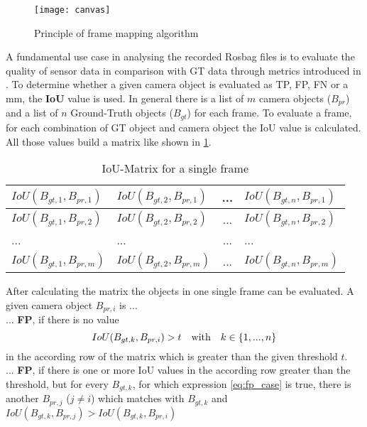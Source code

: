 \begin{figure}[thpb]
	\centering
	\texttt{[image: canvas]}
	\caption{Principle of frame mapping algorithm}
	\label{fig:frame_mapping}
\end{figure}

A fundamental use case in analysing the recorded Rosbag files is to evaluate the quality of sensor data in comparison with GT data through metrics introduced in \cite{Reway}. 
To determine whether a given camera object is evaluated as \ac{TP}, \ac{FP}, \ac{FN} or a \ac{mm}, the \textbf{\ac{IoU}} value is used. 
In general there is a list of $m$ camera objects ($B_{pr}$) and a list of $n$ Ground-Truth objects ($B_{gt}$) for each frame. To evaluate a frame, for each combination of GT object and camera object the IoU value is calculated. All those values build a matrix like shown in \cref{tab:matrix}.
\begin{table}[h]
	\caption{IoU-Matrix for a single frame}
	\begin{tabularx}{\columnwidth}{X|X|c|X}
		\toprule
		$IoU(B_{gt,1}, B_{pr,1})$ & $IoU(B_{gt,2}, B_{pr,1})$ & ... & $IoU(B_{gt,n}, B_{pr,1})$ \\
		\midrule
		$IoU(B_{gt,1}, B_{pr,2})$ & $IoU(B_{gt,2}, B_{pr,2})$ & ... & $IoU(B_{gt,n}, B_{pr,2})$ \\
		\midrule
		... & ... & ... & ... \\
		\midrule		
		$IoU(B_{gt,1}, B_{pr,m})$ & $IoU(B_{gt,2}, B_{pr,m})$ & ... & $IoU(B_{gt,n}, B_{pr,m})$ \\
		\bottomrule
	\end{tabularx}
	\label{tab:matrix}
\end{table}

After calculating the matrix the objects in one single frame can be evaluated. A given camera object $B_{pr,i}$ is ... \\

... \textbf{FP}, if there is no value 
\begin{equation}
	IoU(B_{gt,k}, B_{pr,i}) > t \text{\quad with\quad} k \in \left\lbrace 1, ..., n\right\rbrace 
	\label{eq:fp_case}
\end{equation}
in the according row of the matrix which is greater than the given threshold $t$. \\

... \textbf{FP}, if there is one or more IoU values in the according row greater than the threshold, but for every $B_{gt,k}$, for which expression \cref{eq:fp_case} is true, there is another $B_{pr,j}$ ($j\neq i$) which matches with $B_{gt,k}$ and $IoU(B_{gt,k}, B_{pr,j}) > IoU(B_{gt,k}, B_{pr,i})$ \\

